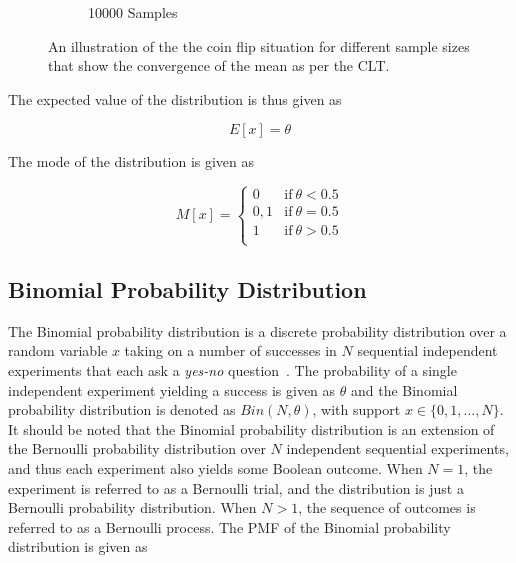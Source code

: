 \begin{figure}[htbp]
\begin{subfigure}{0.49\textwidth}
            \caption{10000 Samples}
            \label{fig:probability:probability_distributions:bernoulli:coin_10000}
      \end{subfigure}
      \par\bigskip
      \caption{An illustration of the the coin flip situation for different sample sizes that show the convergence of the mean as per the \acf{CLT}.}
      \label{fig:probability:probability_distributions:bernoulli:coin}
\end{figure}

The expected value of the distribution is thus given as

\begin{equation}
      \label{eq:probability:probability_distributions:bernoulli:expected_value}
      E[x] = \theta
\end{equation}

The mode of the distribution is given as

\begin{equation}
      \label{eq:probability:probability_distributions:bernoulli:mode}
      M[x] =
      \begin{cases}
            0   & \text{if}\ \theta < 0.5 \\
            0,1 & \text{if}\ \theta = 0.5 \\
            1   & \text{if}\ \theta > 0.5 \\
      \end{cases}
\end{equation}


\subsection{Binomial Probability Distribution}\label{sec:probability:probability_distributions:bin}


The Binomial probability distribution is a discrete probability distribution over a random variable $x$ taking on a number of successes in $N$ sequential independent experiments that each ask a \textit{yes-no} question~\cite{ref:wackerly:2014}. The probability of a single independent experiment yielding a success is given as $\theta$ and the Binomial probability distribution is denoted as $Bin(N, \theta)$, with support $x \in \{0, 1, \dots, N\}$.  It should be noted that the Binomial probability distribution is an extension of the Bernoulli probability distribution over $N$ independent sequential experiments, and thus each experiment also yields some Boolean outcome. When $N=1$, the experiment is referred to as a Bernoulli trial, and the distribution is just a Bernoulli probability distribution. When $N > 1$, the sequence of outcomes is referred to as a Bernoulli process. The \acs{PMF} of the Binomial probability distribution is given as

